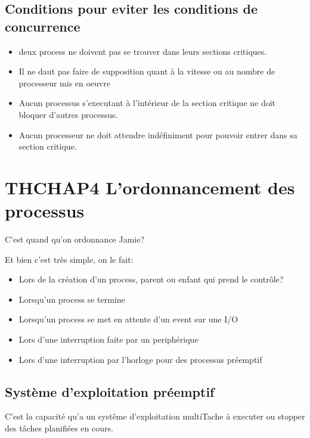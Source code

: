 \subsection{Conditions pour eviter les conditions de concurrence}
\begin{itemize}
    \item deux process ne doivent pas se trouver dans leurs sections critiques.
    \item Il ne daut pas faire de supposition quant à la vitesse ou au nombre de processeur mis en oeuvre
    \item Aucun processus s'executant à l'intérieur de la section critique ne doit bloquer d'autres processus.
    \item Aucun processeur ne doit attendre indéfiniment pour pouvoir entrer dans sa section critique.
\end{itemize}















\newpage
\section{THCHAP4 L'ordonnancement des processus}

C'est quand qu'on ordonnance Jamie? 

Et bien c'est très simple, on le fait: 

\begin{itemize}
    \item Lors de la création d'un process, parent ou enfant qui prend le contrôle?
    \item Lorsqu'un process se termine
    \item Lorsqu'un process se met en attente d'un event sur une I/O 
    \item Lors d'une interruption faite par un periphérique
    \item Lors d'une interruption par l'horloge pour des processus préemptif
\end{itemize}

\subsection{Système d'exploitation préemptif}
C'est la capacité qu'a un systême d'exploitation multiTache à executer ou stopper des tâches planifiées en cours.
